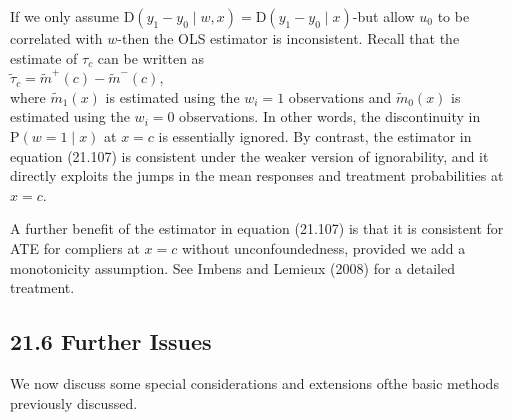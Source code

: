 \documentclass[10pt]{article}
\begin{document}
If we only assume $\mathrm{D}\left(y_{1}-y_{0} \mid w, x\right)=\mathrm{D}\left(y_{1}-y_{0} \mid x\right)$-but allow $u_{0}$ to be correlated with $w$-then the OLS estimator is inconsistent. Recall that the estimate of $\tau_{c}$ can be written as\\
$\tilde{\tau}_{c}=\tilde{m}^{+}(c)-\tilde{m}^{-}(c)$,\\
where $\tilde{m}_{1}(x)$ is estimated using the $w_{i}=1$ observations and $\tilde{m}_{0}(x)$ is estimated using the $w_{i}=0$ observations. In other words, the discontinuity in $\mathrm{P}(w=1 \mid x)$ at $x=c$ is essentially ignored. By contrast, the estimator in equation (21.107) is consistent under the weaker version of ignorability, and it directly exploits the jumps in the mean responses and treatment probabilities at $x=c$.

A further benefit of the estimator in equation (21.107) is that it is consistent for ATE for compliers at $x=c$ without unconfoundedness, provided we add a monotonicity assumption. See Imbens and Lemieux (2008) for a detailed treatment.

\subsection*{21.6 Further Issues}
We now discuss some special considerations and extensions ofthe basic methods previously discussed.
\end{document}
